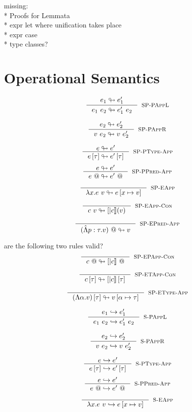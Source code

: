 \documentclass[10pt,a4paper]{article}
\newcommand\highlight[2]{{\setlength\fboxsep{1pt}\colorbox{#1}{#2}}}
\def\NV{\highlight{colorNV}}
\newcommand\rulename[1]{\textsc{#1}}
\newcommand\peval[2]{\ensuremath{#1 \looparrowright #2 }}
\newcommand\eval[2]{\ensuremath{#1 \hookrightarrow #2 }}
\begin{document}
\NV{missing:}\\
\NV{* Proofs for Lemmata}\\
\NV{* expr let where unification takes place}\\
\NV{* expr case}\\
\NV{* type classes?}\\



\section*{Operational Semantics}
\hfill\fbox{\peval{e}{e}}

$$
\inference{
	\peval{e_1}{e_1'}
}{
	\peval{\eapp{e_1}{e_2}}{\eapp{e_1'}{e_2}}
}[\rulename{SP-PAppL}]
$$

$$
\inference{
	\peval{e_2}{e_2'}
}{
	\peval{\eapp{v}{e_2}}{\eapp{v}{e_2'}}
}[\rulename{SP-PAppR}]
$$

$$
\inference{
	\peval{e}{e'}
}{
	\peval{\etapp{e}{\tau}}{\etapp{e'}{\tau}}
}[\rulename{SP-PType-App}]
$$
$$
\inference{
	\peval{e}{e'}
}{
	\peval{\epapp{e}}{\epapp{e'}}
}[\rulename{SP-PPred-App}]
$$

$$
\inference{
}{
	\peval{\eapp{\efun{x}{e}}{v}}{e\sub{x}{v}}
}[\rulename{SP-EApp}]
$$

$$
\inference{
}{
	\peval{\eapp{c}{v}}{[|c|](v)}
}[\rulename{SP-EApp-Con}]
$$

$$
\inference{
}{
	\peval{\epapp{(\epabs{p}{\tau}{v})}}{v}
}[\rulename{SP-EPred-App}]
$$

\NV{are the following two rules valid?}
$$
\inference{
}{
	\peval{\epapp{c}}{\epapp{[|c|]}}
}[\rulename{SP-EPApp-Con}]
$$

$$
\inference{
}{
	\peval{\etapp{c}{\tau}}{\etapp{[|c|]}{\tau}}
}[\rulename{SP-ETApp-Con}]
$$

$$
\inference{
}{
	\peval{\etapp{(\etabs{\alpha}{v})}{\tau}}{v\sub{\alpha}{\tau}}
}[\rulename{SP-EType-App}]
$$


\hfill\fbox{\eval{e}{e}}

$$
\inference{
	\eval{e_1}{e_1'}
}{
	\eval{\eapp{e_1}{e_2}}{\eapp{e_1'}{e_2}}
}[\rulename{S-PAppL}]
$$

$$
\inference{
	\eval{e_2}{e_2'}
}{
	\eval{\eapp{v}{e_2}}{\eapp{v}{e_2'}}
}[\rulename{S-PAppR}]
$$

$$
\inference{
	\eval{e}{e'}
}{
	\eval{\etapp{e}{\tau}}{\etapp{e'}{\tau}}
}[\rulename{S-PType-App}]
$$
$$
\inference{
	\eval{e}{e'}
}{
	\eval{\epapp{e}}{\epapp{e'}}
}[\rulename{S-PPred-App}]
$$

$$
\inference{
}{
	\eval{\eapp{\efun{x}{e}}{v}}{e\sub{x}{v}}
}[\rulename{S-EApp}]
$$
\end{document}
